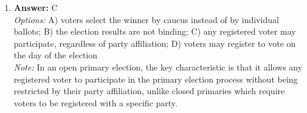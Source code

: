\documentclass[12pt]{article}
\begin{document}
\begin{enumerate}[label=\arabic*.]
\\ \textit{Note:} The president's chief of staff plays a crucial role in managing the flow of information and access between the cabinet secretaries and the president, effectively controlling how and when they can interact.
\item \textbf{Answer:} C
\\ \textit{Options:} A) voters select the winner by caucus instead of by individual ballots; B) the election results are not binding; C) any registered voter may participate, regardless of party affiliation; D) voters may register to vote on the day of the election
\\ \textit{Note:} In an open primary election, the key characteristic is that it allows any registered voter to participate in the primary election process without being restricted by their party affiliation, unlike closed primaries which require voters to be registered with a specific party.
\end{enumerate}
\end{document}
